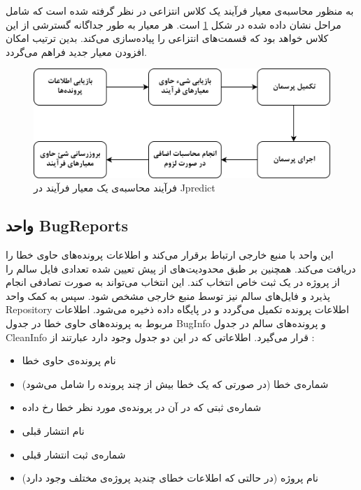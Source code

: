 به منظور محاسبه‌ی معیار فرآیند یک کلاس انتزاعی در نظر گرفته شده است که شامل مراحل نشان داده شده در شکل \ref{fig:process-chart}  است. هر معیار به طور جداگانه گسترشی از این کلاس خواهد بود که  قسمت‌های انتزاعی را پیاده‌سازی می‌کند. بدین ترتیب امکان افزودن معیار جدید فراهم می‌گردد. 
\begin{figure}[H]
	\centering
	\includegraphics[width=.8\textwidth]{img/method/process-chart.png}
	\caption{ فرآیند محاسبه‌ی یک معیار فرآیند در Jpredict}
	\label{fig:process-chart}
\end{figure}


\subsection{واحد BugReports  }
این واحد با منبع خارجی ارتباط برقرار می‌کند و اطلاعات پرونده‌های حاوی خطا را دریافت می‌کند. همچنین بر طبق محدودیت‌های از پیش تعیین شده تعدادی فایل سالم را از پروژه در یک ثبت خاص انتخاب کند. این انتخاب می‌تواند به صورت تصادفی انجام پذیرد و فایل‌های سالم نیز توسط منبع خارجی مشخص شود. سپس به کمک واحد Repository اطلاعات پرونده تکمیل می‌گردد و در پایگاه داده ذخیره می‌شود. اطلاعات مربوط به پرونده‌های حاوی خطا در جدول BugInfo و پرونده‌های سالم در جدول CleanInfo  قرار می‌گیرد. اطلاعاتی که در این دو جدول وجود دارد عبارتند از :
\begin{itemize}
	\item 
	نام پرونده‌ی حاوی خطا
	\item
	شماره‌ی خطا (در صورتی که یک خطا بیش از چند پرونده را شامل می‌شود)
	\item
	شماره‌ی ثبتی که در آن در پرونده‌ی مورد نظر خطا رخ داده
	\item
	نام انتشار قبلی
	\item
	شماره‌ی ثبت انتشار قبلی
	\item 
	نام پروژه (در حالتی که اطلاعات خطای چندید پروژه‌ی مختلف وجود دارد)
\end{itemize}

